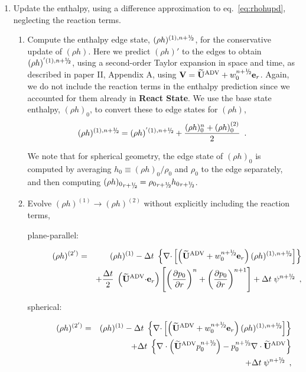 \begin{description}
\begin{enumerate}
\item Update the enthalpy, using a difference approximation to
  eq.~\ref{eq:rhohupd}, neglecting the reaction terms.

  \begin{enumerate}
  \renewcommand{\labelenumii}{{\bf \roman{enumii}}.}

  \item Compute the enthalpy edge state, $(\rho h)^{(1),\nph}$, for
    the conservative update of $(\rho h)$. Here we predict $(\rho h)'$
    to the edges to obtain $(\rho h)^{'(1),\nph}$, 
    using a second-order Taylor expansion in space and
    time, as described in paper II, Appendix A, using $\Vb =
    \uadvtwo+w_0^{\nph} \er$.  Again, we do not include the reaction
    terms in the enthalpy prediction since we accounted for them
    already in {\bf React State}. We use the base state enthalpy,
    $(\rho h)_0$, to convert these to edge states for $(\rho h)$,
\begin{equation}
(\rho h)^{(1),\nph} = 
(\rho h)^{'(1),\nph} + \frac{(\rho h)_0^n + (\rho h)_0^{(2)}}{2} \enskip .
\end{equation}

   We note that for spherical geometry, the edge state of $(\rho h)_0$
   is computed by averaging $h_0 \equiv (\rho h)_0/\rho_0$ and $\rho_0$
   to the edge separately, and then computing 
   ${(\rho h)_0}_{r+\myhalf} = {\rho_0}_{r+\myhalf} {h_0}_{r+\myhalf}$.
   \item Evolve $(\rho h)^{(1)} \rightarrow (\rho h)^{(2)}$ without
     explicitly including the reaction terms,

\begin{description}
\item[plane-parallel:]

\begin{eqnarray}
(\rho h)^{(2')} &=& (\rho h)^{(1)} - \dt \; \left\{ \nablab \cdotb \left[ \left(\uadvtwo+w_0^{\nph} \er\right)  
(\rho h)^{(1),\nph} \right] \right\} \nonumber \\
&& + \frac{\dt}{2} \; \left(\uadvtwo \cdotb \er\right)
\left [ \left(\frac{\partial p_0}{\partial r} \right)^{n}
      + \left(\frac{\partial p_0}{\partial r} \right)^{n+1}  \right ] 
+ \dt \; \psi^{\nph} \enskip ,
\end{eqnarray}

\item[spherical:]

\begin{eqnarray}
(\rho h)^{(2')} &=& (\rho h)^{(1)} - \dt \; \left\{ \nablab \cdotb \left[ \left(\uadvtwo+w_0^{\nph} \er\right)  
(\rho h)^{(1),\nph} \right] \right\} \nonumber \\
    && + \dt \; \left \{ \nabla \cdot \left (\uadvtwo p_0^{\nph} \right ) 
       - p_0^{\nph} \nabla \cdot \uadvtwo \right \} \nonumber \\
    && + \dt \; \psi^{\nph} \enskip ,
\end{eqnarray}


\end{description}
\end{enumerate}
\end{enumerate}
\end{description}
